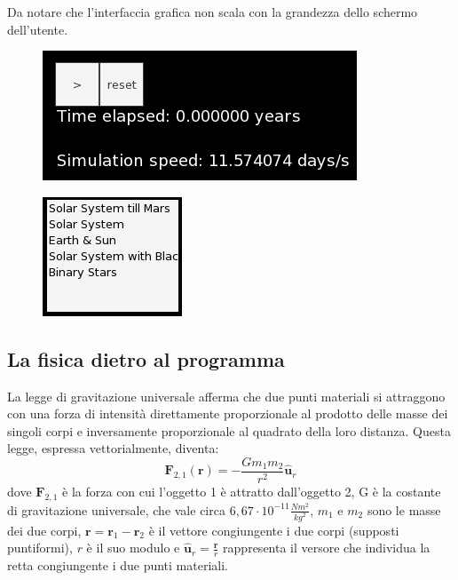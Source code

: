 \documentclass{article}
\begin{document}
Da notare che l'interfaccia grafica non scala con la grandezza dello schermo dell'utente.

\begin{figure} [H]
    \centering
    \includegraphics[height=.20\linewidth]{Playpause.png}
    \label{playpause}
\end{figure}

\begin{figure} [H]
    \centering
    \includegraphics[height=.20\linewidth]{menu.png}
    \label{menu}
\end{figure}

\subsection{La fisica dietro al programma}
\label{fisica}
La legge di gravitazione universale afferma che due punti materiali si attraggono con una forza di intensità direttamente proporzionale al prodotto delle masse dei singoli corpi e inversamente proporzionale al quadrato della loro distanza. Questa legge, espressa vettorialmente, diventa:
\begin{equation}
    \mathbf{F}_{2,1}(\mathbf{r})=-\frac{Gm_{1}m_{2}}{r^{2}}\mathbf{\hat{u}}_{r}
\end{equation}
dove $\textbf{F}_{2,1}$ è la forza con cui l'oggetto 1 è attratto dall'oggetto 2, G è la costante di gravitazione universale, che vale circa $6,67\cdot 10^{-11}\frac{Nm^2}{kg^2}$, $m_1$ e $m_2$ sono le masse dei due corpi, $\textbf{r}=\textbf{r}_1-\textbf{r}_2$ è il vettore congiungente i due corpi (supposti puntiformi), 
$r$ è il suo modulo e $\hat{\textbf{u}}_{r}=\frac{\textbf{r}}{r}$ rappresenta il versore che individua la retta congiungente i due punti materiali.
\end{document}
